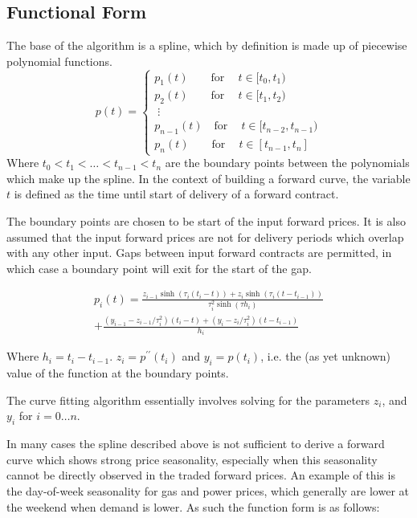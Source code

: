 \documentclass{article}
\begin{document}
\subsection{Functional Form}
The base of the algorithm is a spline, which by definition is made up of piecewise polynomial functions.
\begin{equation}
p(t) = 
\begin{cases}
    p_1(t)\qquad \text{for}\ \quad t \in [t_0, t_1) \\
    p_2(t)\qquad \text{for}\ \quad t \in [t_1, t_2) \\
    \;\vdots \\
    p_{n-1}(t)\quad \text{for}\ \quad t \in [t_{n-2}, t_{n-1}) \\
    p_n(t)\qquad \text{for}\ \quad t \in [t_{n-1}, t_n]
\end{cases}
\end{equation}
Where $t_0 < t_1 < \hdots < t_{n-1} < t_{n}$ are the boundary points between the polynomials which make up the spline.
In the context of building a forward curve, the variable $t$ is defined as
the time until start of delivery of a forward contract.

\bigskip

The boundary points are chosen to be start of the input forward prices. It is also
assumed that the input forward prices are not for delivery periods which overlap
with any other input. Gaps between input forward contracts are permitted, in which
case a boundary point will exit for the start of the gap.

\bigskip

\begin{multline}
p_i(t) = \frac{z_{i-1} \sinh(\tau_i (t_i - t)) + z_i \sinh(\tau_i (t - t_{i-1}))}{\tau_i^2 \sinh(\tau h_i)}  \\
    + \frac{(y_{i-1} - z_{i-1}/\tau_i^2)(t_i - t) + (y_i - z_i/\tau_i^2)(t - t_{i-1})}{h_i}
\end{multline}

Where $h_i =  t_i - t_{i-1}$. 
$z_i = p^{\prime \prime}(t_i)$ and $y_i = p(t_i)$, i.e. the (as yet unknown) value of the function at
the boundary points.

The curve fitting algorithm essentially involves solving for the parameters
$z_i$, and $y_i$ for $i=0 \hdots n$.

\bigskip
In many cases the spline described above is not sufficient to derive a forward curve which
shows strong price seasonality, especially when this seasonality cannot be directly observed
in the traded forward prices. An example of this is the day-of-week seasonality for gas and
power prices, which generally are lower at the weekend when demand is lower. As such the 
function form is as follows:
\end{document}
